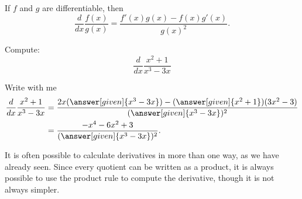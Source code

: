 \documentclass{ximera}
\begin{document}
\begin{theorem}\label{theorem:quotient-rule}
If $f$ and $g$ are differentiable, then
\[
\frac{d}{dx} \frac{f(x)}{g(x)} = \frac{f'(x)g(x)-f(x)g'(x)}{g(x)^2}.
\]
\end{theorem}



\begin{example}
Compute:
\[
\frac{d}{dx} \frac{x^2+1}{x^3-3x}
\]

\begin{explanation}
Write with me
\begin{align*}
\frac{d}{dx} \frac{x^2+1}{x^3-3x} &= \frac{2x(\answer[given]{x^3-3x})-(\answer[given]{x^2+1})(3x^2-3)}{(\answer[given]{x^3-3x})^2}\\
&=\frac{-x^4-6x^2+3}{(\answer[given]{x^3-3x})^2}.
\end{align*}
\end{explanation}
\end{example}

It is often possible to calculate derivatives in more than one way, as
we have already seen. Since every quotient can be written as a
product, it is always possible to use the product rule to compute the
derivative, though it is not always simpler.
\end{document}
